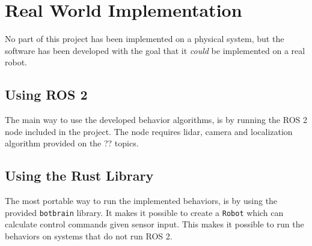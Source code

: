 \section{Real World Implementation}
No part of this project has been implemented on a physical system, but the software has been developed with the goal that it \emph{could} be implemented on a real robot.

\subsection{Using ROS 2}
The main way to use the developed behavior algorithms, is by running the ROS 2 node included in the project. The node requires {\color{red} lidar, camera and localization algorithm provided on the ?? topics}.

\subsection{Using the Rust Library}
The most portable way to run the implemented behaviors, is by using the {\color{red} provided} \texttt{botbrain} library. It makes it possible to create a \texttt{Robot} which can calculate control commands given sensor input. This makes it possible to run the behaviors on systems that do not run ROS 2.


